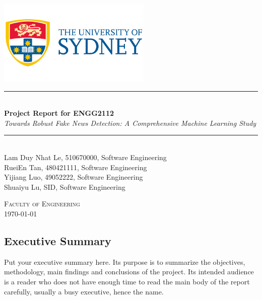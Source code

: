 \documentclass[12pt,a4paper]{article}
\newcommand{\HRule}{\rule{\linewidth}{0.5mm}}
\begin{document}
	
	\begin{titlepage}
		\begin{center}
			
			\includegraphics[width=0.55\textwidth]{the-university-of-sydney-vector-logo.png}~\\[2cm]
			
			
			\HRule \\[0.4cm]
			{ \LARGE 
				\textbf{Project Report for ENGG2112}\\[0.4cm]
				\emph{Towards Robust Fake News Detection: A Comprehensive Machine Learning Study}\\[0.4cm]
			}
			\HRule \\[1.5cm]
			
			
			
			{ \large
				Lam Duy Nhat Le, 510670000, Software Engineering \\[0.1cm]
				RueiEn Tan, 480421111, Software Engineering\\[0.1cm]
				Yijiang Luo, 49052222, Software Engineering\\[0.1cm]
				Shuaiyu Lu, SID, Software Engineering\\[0.1cm]
			}
			
			\vfill
			
			\textsc{\large Faculty of Engineering}\\[0.4cm]
			
			
			{\large \today}
			
		\end{center}
	\end{titlepage}
	
	\begin{center}

	\subsection*{Executive Summary}
	\end{center}
	
	\noindent Put your executive summary here. Its purpose is to summarize the objectives, methodology, main findings and conclusions of the project. Its intended audience is a reader who does not have enough time to read the main body of the report carefully, usually a busy executive, hence the name.
	
\end{document}
